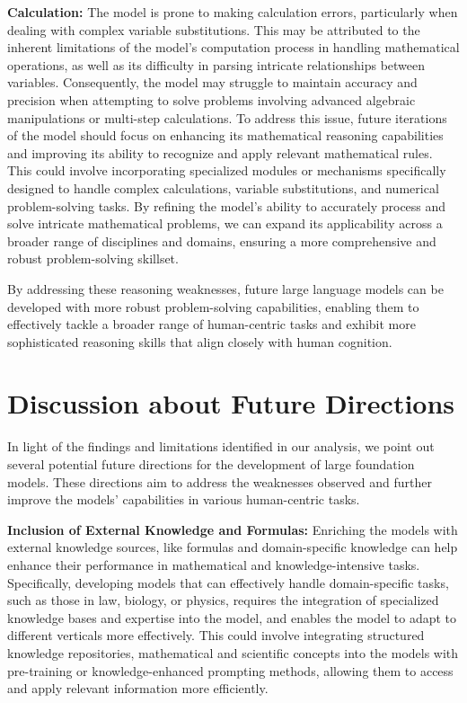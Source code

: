 \textbf{Calculation:} The model is prone to making calculation errors, particularly when dealing with complex variable substitutions. This may be attributed to the inherent limitations of the model's computation process in handling mathematical operations, as well as its difficulty in parsing intricate relationships between variables. Consequently, the model may struggle to maintain accuracy and precision when attempting to solve problems involving advanced algebraic manipulations or multi-step calculations. To address this issue, future iterations of the model should focus on enhancing its mathematical reasoning capabilities and improving its ability to recognize and apply relevant mathematical rules. This could involve incorporating specialized modules or mechanisms specifically designed to handle complex calculations, variable substitutions, and numerical problem-solving tasks. By refining the model's ability to accurately process and solve intricate mathematical problems, we can expand its applicability across a broader range of disciplines and domains, ensuring a more comprehensive and robust problem-solving skillset.

By addressing these reasoning weaknesses, future large language models can be developed with more robust problem-solving capabilities, enabling them to effectively tackle a broader range of human-centric tasks and exhibit more sophisticated reasoning skills that align closely with human cognition.

\section{Discussion about Future Directions} In light of the findings and limitations identified in our analysis, we point out several potential future directions for the development of large foundation models. These directions aim to address the weaknesses observed and further improve the models' capabilities in various human-centric tasks.
\par{\textbf{Inclusion of External Knowledge and Formulas:}} Enriching the models with external knowledge sources, like formulas and domain-specific knowledge can help enhance their performance in mathematical and knowledge-intensive tasks. Specifically, developing models that can effectively handle domain-specific tasks, such as those in law, biology, or physics, requires the integration of specialized knowledge bases and expertise into the model, and enables the model to adapt to different verticals more effectively. This could involve integrating structured knowledge repositories, mathematical and scientific concepts  into the models with pre-training or knowledge-enhanced prompting methods, allowing them to access and apply relevant information more efficiently.

